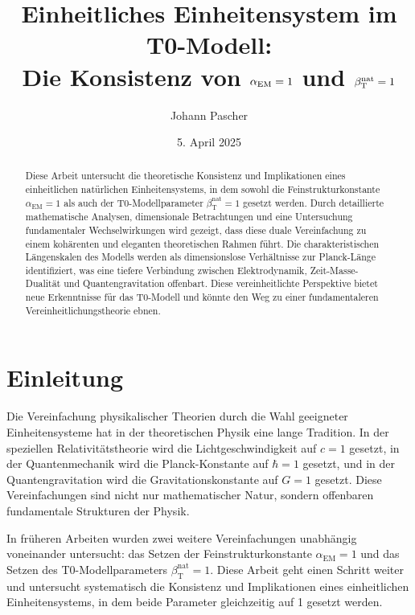 \documentclass[12pt,a4paper]{article}
\title{Einheitliches Einheitensystem im T0-Modell: \\Die Konsistenz von \(\alphaEM = 1\) und \(\betaT^{\text{nat}} = 1\)}
\author{Johann Pascher}
\date{5. April 2025}
\newcommand{\alphaEM}{\alpha_{\text{EM}}}
\newcommand{\betaT}{\beta_{\text{T}}}
\begin{document}
	
	\maketitle
	
	\begin{abstract}
		Diese Arbeit untersucht die theoretische Konsistenz und Implikationen eines einheitlichen natürlichen Einheitensystems, in dem sowohl die Feinstrukturkonstante \(\alphaEM = 1\) als auch der T0-Modellparameter \(\betaT^{\text{nat}} = 1\) gesetzt werden. Durch detaillierte mathematische Analysen, dimensionale Betrachtungen und eine Untersuchung fundamentaler Wechselwirkungen wird gezeigt, dass diese duale Vereinfachung zu einem kohärenten und eleganten theoretischen Rahmen führt. Die charakteristischen Längenskalen des Modells werden als dimensionslose Verhältnisse zur Planck-Länge identifiziert, was eine tiefere Verbindung zwischen Elektrodynamik, Zeit-Masse-Dualität und Quantengravitation offenbart. Diese vereinheitlichte Perspektive bietet neue Erkenntnisse für das T0-Modell und könnte den Weg zu einer fundamentaleren Vereinheitlichungstheorie ebnen.
	\end{abstract}
	
	\tableofcontents
	\newpage
	
	\section{Einleitung}
	\label{sec:introduction}
	
	Die Vereinfachung physikalischer Theorien durch die Wahl geeigneter Einheitensysteme hat in der theoretischen Physik eine lange Tradition. In der speziellen Relativitätstheorie wird die Lichtgeschwindigkeit auf \(c = 1\) gesetzt, in der Quantenmechanik wird die Planck-Konstante auf \(\hbar = 1\) gesetzt, und in der Quantengravitation wird die Gravitationskonstante auf \(G = 1\) gesetzt. Diese Vereinfachungen sind nicht nur mathematischer Natur, sondern offenbaren fundamentale Strukturen der Physik.
	
	In früheren Arbeiten \cite{pascher_alpha_2025, pascher_alphabeta_2025} wurden zwei weitere Vereinfachungen unabhängig voneinander untersucht: das Setzen der Feinstrukturkonstante \(\alphaEM = 1\) und das Setzen des T0-Modellparameters \(\betaT^{\text{nat}} = 1\). Diese Arbeit geht einen Schritt weiter und untersucht systematisch die Konsistenz und Implikationen eines einheitlichen Einheitensystems, in dem beide Parameter gleichzeitig auf 1 gesetzt werden.
	
\end{document}
